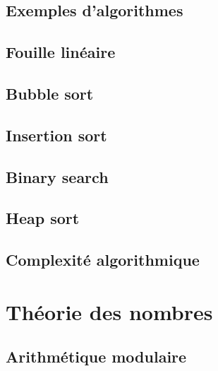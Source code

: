 \documentclass[
  letterpaper,
]{scrbook}
\theoremstyle{definition}
\theoremstyle{definition}
\theoremstyle{remark}
\begin{document}
\hypertarget{exemples-dalgorithmes}{%
\section{Exemples d'algorithmes}\label{exemples-dalgorithmes}}

\hypertarget{fouille-linuxe9aire}{%
\section{Fouille linéaire}\label{fouille-linuxe9aire}}

\hypertarget{bubble-sort}{%
\section{Bubble sort}\label{bubble-sort}}

\hypertarget{insertion-sort}{%
\section{Insertion sort}\label{insertion-sort}}

\hypertarget{binary-search}{%
\section{Binary search}\label{binary-search}}

\hypertarget{heap-sort}{%
\section{Heap sort}\label{heap-sort}}

\hypertarget{complexituxe9-algorithmique}{%
\section{Complexité algorithmique}\label{complexituxe9-algorithmique}}


\hypertarget{thuxe9orie-des-nombres}{%
\chapter{Théorie des nombres}\label{thuxe9orie-des-nombres}}

\hypertarget{arithmuxe9tique-modulaire}{%
\section{Arithmétique modulaire}\label{arithmuxe9tique-modulaire}}
\end{document}
